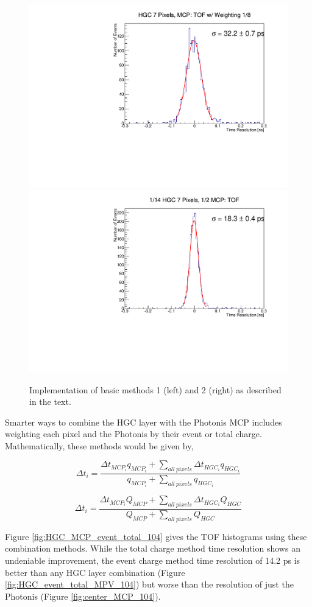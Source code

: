 \documentclass[12pt]{article}
\begin{document}
\begin{figure}[h]
\centering
	\includegraphics[width=.49\textwidth]{deltaT_PicoSil_MCP_Equal104.pdf}
	\includegraphics[width=.49\textwidth]{deltaT_PicoSilEqual_MCP_Equal104.pdf}
	\caption{Implementation of basic methods 1 (left) and 2 (right) as described in the text. }
	\label{fig:m12}
\end{figure}

Smarter ways to combine the HGC layer with the Photonis MCP includes weighting each pixel and the Photonis by their event or total charge. 
Mathematically, these methods would be given by,

\[
\Delta t_i = 
\dfrac{ \Delta t_{MCP_i} q_{MCP_i} +
	\sum\limits_{all\ pixels} \Delta t_{HGC_i} q_{HGC_i} }
	{ q_{MCP_i} +
	\sum\limits_{all\ pixels} q_{HGC_i} }
\]

\[
\Delta t_i = 
\dfrac{ \Delta t_{MCP_i} Q_{MCP} +
	\sum\limits_{all\ pixels} \Delta t_{HGC_i} Q_{HGC} }
	{ Q_{MCP} +
	\sum\limits_{all\ pixels} Q_{HGC} }
\]

Figure \ref{fig:HGC_MCP_event_total_104} gives the TOF histograms using these combination methods. While the total charge method time resolution shows an undeniable improvement, the event charge method time resolution of 14.2 ps is better than any HGC layer combination (Figure \ref{fig:HGC_event_total_MPV_104}) but worse than the resolution of just the Photonis (Figure \ref{fig:center_MCP_104}).
\end{document}
